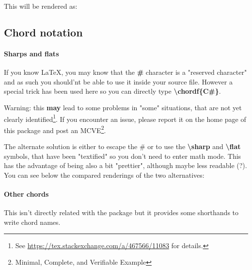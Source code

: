 \documentclass[11pt]{article}
\newcommand{\btt}{\bfseries \ttfamily }
\newcommand{\tbs}{\textbackslash{}}
\begin{document}


This will be rendered as:
\def\chordFontSize{\Large\bfseries}
\resetchordbars
\countbarsNo


\subsection{Chord notation}

\paragraph{Sharps and flats}

If you know \LaTeX, you may know that the {\btt \#} character is a "reserved character" and as such you should'nt be able to use it inside your source file.
However a special trick has been used here so you can directly type {\btt \tbs chordf\{C\#\}}.

Warning: this {\bf may} lead to some problems in "some" situations, that are not yet clearly identified\footnote{See \url{https://tex.stackexchange.com/a/467566/11083} for details.}.
If you encounter an issue, please report it on the home page of this package and post an MCVE\footnote{Minimal, Complete, and Verifiable Example}.

The alternate solution is either to escape the \# or to use the {\btt \tbs sharp} and {\btt \tbs flat} symbols, that have been "textified" so you don't need to enter math mode.
This has the advantage of being also a bit "prettier", although maybe less readable (?).
You can see below the compared renderings of the two alternatives:

\vspace{1em}

\noindent
\begin{minipage}{0.6\textwidth}

\end{minipage}
%
\begin{minipage}{0.3\textwidth}
\def\chordFontSize{\Huge\bfseries}

\end{minipage}

\paragraph{Other chords}
This isn't directly related with the package but it provides some shorthands to write chord names.
\end{document}
